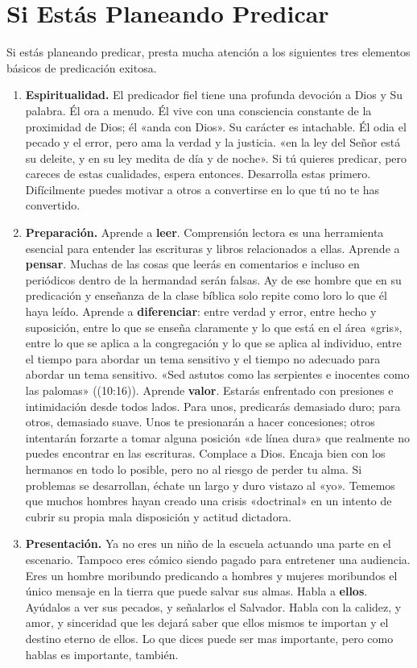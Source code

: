 \documentclass[12pt, twoside, openright]{book}
\begin{document}
\section{Si Estás Planeando Predicar}
Si estás planeando predicar, presta mucha atención a los siguientes tres elementos básicos de predicación exitosa. 
\begin{enumerate}
\item \textbf{Espiritualidad.} El predicador fiel tiene una profunda devoción a Dios y Su palabra. Él ora a menudo. Él vive con una consciencia constante de la proximidad de Dios; él «anda con Dios». Su carácter es intachable. Él odia el pecado y el error, pero ama la verdad y la justicia. «en la ley del Señor está su deleite, y en su ley medita de día y de noche». Si tú quieres predicar, pero careces de estas cualidades, espera entonces. Desarrolla estas primero. Difícilmente puedes motivar a otros a convertirse en lo que tú no te has convertido. 
\item \textbf{Preparación.} Aprende a \textbf{leer}. Comprensión lectora es una herramienta esencial para entender las escrituras y libros relacionados a ellas. Aprende a \textbf{pensar}. Muchas de las cosas que leerás en comentarios e incluso en periódicos dentro de la hermandad serán falsas. Ay de ese hombre que en su predicación y enseñanza de la clase bíblica solo repite como loro lo que él haya leído. Aprende a \textbf{diferenciar}: entre verdad y error, entre hecho y suposición, entre lo que se enseña claramente y lo que está en el área «gris», entre lo que se aplica a la congregación y lo que se aplica al individuo, entre el tiempo para abordar un tema sensitivo y el tiempo no adecuado para abordar un tema sensitivo. «Sed astutos como las serpientes e inocentes como las palomas» ((10:16)). Aprende \textbf{valor}. Estarás enfrentado con presiones e intimidación desde todos lados. Para unos, predicarás demasiado duro; para otros, demasiado suave. Unos te presionarán a hacer concesiones; otros intentarán forzarte a tomar alguna posición «de línea dura» que realmente no puedes encontrar en las escrituras. Complace a Dios. Encaja bien con los hermanos en todo lo posible, pero no al riesgo de perder tu alma. Si problemas se desarrollan, échate un largo y duro vistazo al «yo». Tememos que muchos hombres hayan creado una crisis «doctrinal» en un intento de cubrir su propia mala disposición y actitud dictadora. 
\item \textbf{Presentación.} Ya no eres un niño de la escuela actuando una parte en el escenario. Tampoco eres cómico siendo pagado para entretener una audiencia. Eres un hombre moribundo predicando a hombres y mujeres moribundos el único mensaje en la tierra que puede salvar sus almas. Habla a \textbf{ellos}. Ayúdalos a ver sus pecados, y señalarlos el Salvador. Habla con la calidez, y amor, y sinceridad que les dejará saber que ellos mismos te importan y el destino eterno de ellos. Lo que dices puede ser mas importante, pero como hablas es importante, también.
\end{enumerate}
\end{document}
